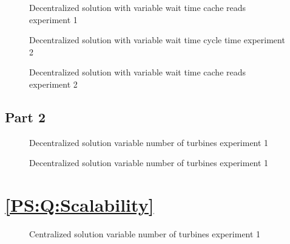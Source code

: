 \begin{figure}[h]
	
	\caption{Decentralized solution with variable wait time cache reads experiment 1}
	\label{fig:exp:decen:sleep_cache}
\end{figure}

\begin{figure}[h]
	
	\caption{Decentralized solution with variable wait time cycle time experiment 2}
	\label{fig:exp:decen:sleep2}
\end{figure}

\begin{figure}[h]
	
	\caption{Decentralized solution with variable wait time cache reads experiment 2}
	\label{fig:exp:decen:sleep2_cache}
\end{figure}

\subsection{Part 2}

\begin{figure}[h]
	
	\caption{Decentralized solution variable number of turbines experiment 1}
	\label{fig:exp:decen:turbines}
\end{figure}

\begin{figure}[h]
	
	\caption{Decentralized solution variable number of turbines experiment 1}
	\label{fig:exp:decen:turbines_cache}
\end{figure}

\section{\ref{PS:Q:Scalability}}

\begin{figure}[h]
	
	\caption{Centralized solution variable number of turbines experiment 1}
	\label{fig:exp:cen:turbines}
\end{figure}
